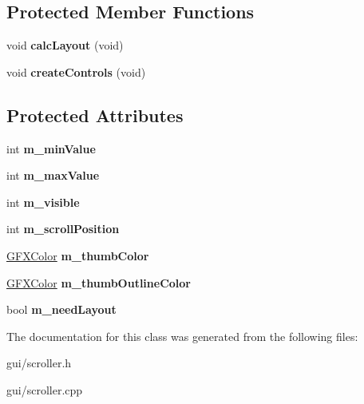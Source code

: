 \subsection*{Protected Member Functions}
\begin{DoxyCompactItemize}
\item 
void {\bfseries calc\+Layout} (void)\hypertarget{classScroller_a368a76946425d5f4da4e1893fb59b21c}{}\label{classScroller_a368a76946425d5f4da4e1893fb59b21c}

\item 
void {\bfseries create\+Controls} (void)\hypertarget{classScroller_a04f38864cdb025a6396ac955f7c89bc4}{}\label{classScroller_a04f38864cdb025a6396ac955f7c89bc4}

\end{DoxyCompactItemize}
\subsection*{Protected Attributes}
\begin{DoxyCompactItemize}
\item 
int {\bfseries m\+\_\+min\+Value}\hypertarget{classScroller_a6a9c77c66c82ed0844bc3a4e973e4adf}{}\label{classScroller_a6a9c77c66c82ed0844bc3a4e973e4adf}

\item 
int {\bfseries m\+\_\+max\+Value}\hypertarget{classScroller_a07c4ab2e823cb77bd8df5a87dad3224b}{}\label{classScroller_a07c4ab2e823cb77bd8df5a87dad3224b}

\item 
int {\bfseries m\+\_\+visible}\hypertarget{classScroller_ad974739f585e37751ee7ae39ca2780d2}{}\label{classScroller_ad974739f585e37751ee7ae39ca2780d2}

\item 
int {\bfseries m\+\_\+scroll\+Position}\hypertarget{classScroller_afd7f3baa9bb53f6d2fab10446d4820fc}{}\label{classScroller_afd7f3baa9bb53f6d2fab10446d4820fc}

\item 
\hyperlink{structGFXColor}{G\+F\+X\+Color} {\bfseries m\+\_\+thumb\+Color}\hypertarget{classScroller_ab62e07e5f5ee66b577467cd73955fc3f}{}\label{classScroller_ab62e07e5f5ee66b577467cd73955fc3f}

\item 
\hyperlink{structGFXColor}{G\+F\+X\+Color} {\bfseries m\+\_\+thumb\+Outline\+Color}\hypertarget{classScroller_ac50ca1df432750ec1df147dffa27cc10}{}\label{classScroller_ac50ca1df432750ec1df147dffa27cc10}

\item 
bool {\bfseries m\+\_\+need\+Layout}\hypertarget{classScroller_aecb36153103c174f0a11802020d25648}{}\label{classScroller_aecb36153103c174f0a11802020d25648}

\end{DoxyCompactItemize}


The documentation for this class was generated from the following files\+:\begin{DoxyCompactItemize}
\item 
gui/scroller.\+h\item 
gui/scroller.\+cpp\end{DoxyCompactItemize}
